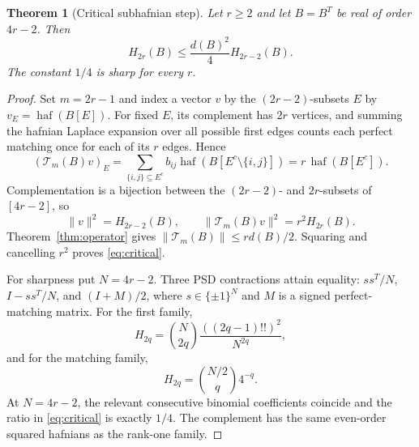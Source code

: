 \documentclass[11pt]{article}
\newtheorem{theorem}{Theorem}
\theoremstyle{remark}\newtheorem{remark}[theorem]{Remark}
\DeclareMathOperator{\haf}{haf}\DeclareMathOperator{\tr}{tr}
\begin{document}
\begin{theorem}[Critical subhafnian step]\label{thm:critical}
Let $r\ge2$ and let $B=B^T$ be real of order $4r-2$.  Then
\begin{equation}\label{eq:critical}
\boxed{H_{2r}(B)\le\frac{d(B)^2}{4}H_{2r-2}(B).}
\end{equation}
The constant $1/4$ is sharp for every $r$.
\end{theorem}
\begin{proof}
Set $m=2r-1$ and index a vector $v$ by the $(2r-2)$-subsets $E$ by
$v_E=\haf(B[E])$.  For fixed $E$, its complement has $2r$ vertices, and
summing the hafnian Laplace expansion over all possible first edges counts
each perfect matching once for each of its $r$ edges.  Hence
\begin{equation}\label{eq:hafrec}
(\mathcal T_m(B)v)_E
=\sum_{\{i,j\}\subseteq E^c}b_{ij}
\haf(B[E^c\setminus\{i,j\}])
=r\,\haf(B[E^c]).
\end{equation}
Complementation is a bijection between the $(2r-2)$- and $2r$-subsets of
$[4r-2]$, so
\[
\|v\|^2=H_{2r-2}(B),\qquad
\|\mathcal T_m(B)v\|^2=r^2H_{2r}(B).
\]
Theorem~\ref{thm:operator} gives
$\|\mathcal T_m(B)\|\le r d(B)/2$.  Squaring and cancelling $r^2$ proves
\eqref{eq:critical}.

For sharpness put $N=4r-2$.  Three PSD contractions attain equality:
$ss^T/N$, $I-ss^T/N$, and $(I+M)/2$, where $s\in\{\pm1\}^N$ and $M$ is a
signed perfect-matching matrix.  For the first family,
\[
H_{2q}=\binom N{2q}\frac{((2q-1)!!)^2}{N^{2q}},
\]
and for the matching family,
\[
H_{2q}=\binom{N/2}{q}4^{-q}.
\]
At $N=4r-2$, the relevant consecutive binomial coefficients coincide and the
ratio in \eqref{eq:critical} is exactly $1/4$.  The complement has the same
even-order squared hafnians as the rank-one family.
\end{proof}
\end{document}
